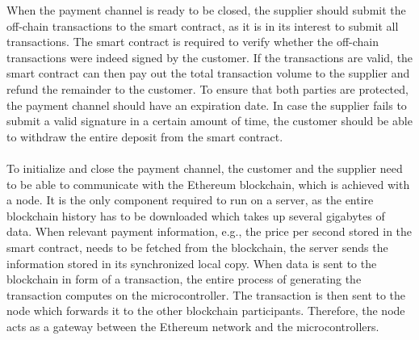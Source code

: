 When the payment channel is ready to be closed, the supplier should submit the off-chain transactions to the smart contract, as it is in its interest to submit all transactions.
The smart contract is required to verify whether the off-chain transactions were indeed signed by the customer.
If the transactions are valid, the smart contract can then pay out the total transaction volume to the supplier and refund the remainder to the customer.
To ensure that both parties are protected, the payment channel should have an expiration date.
In case the supplier fails to submit a valid signature in a certain amount of time, the customer should be able to withdraw the entire deposit from the smart contract.
\\\\
To initialize and close the payment channel, the customer and the supplier need to be able to communicate with the Ethereum blockchain, which is achieved with a node.
It is the only component required to run on a server, as the entire blockchain history has to be downloaded which takes up several gigabytes of data.
When relevant payment information, e.g., the price per second stored in the smart contract, needs to be fetched from the blockchain, the server sends the information stored in its synchronized local copy.
When data is sent to the blockchain in form of a transaction, the entire process of generating the transaction computes on the microcontroller.
The transaction is then sent to the node which forwards it to the other blockchain participants.
Therefore, the node acts as a gateway between the Ethereum network and the microcontrollers.
\\
